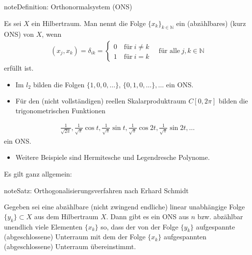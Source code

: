 \documentclass[letterpaper,10pt,english]{jupyterBook}
\begin{document}
\begin{sphinxadmonition}{note}{Definition: Orthonormalsystem (ONS)}

Es sei \(X\) ein Hilbertraum. Man nennt die Folge \(\{x_k\}_{k\in\mathbb{N}}\) ein (abzählbares)  (kurz ONS) von \(X\), wenn
\begin{equation*}
\begin{split}(x_j, x_k) = \delta_{i k} = \begin{cases}
0\quad \text{für}\ i\not= k\\
1\quad \text{für}\ i = k\end{cases}\quad \text{für alle}\ j,k\in\mathbb{N}\end{split}
\end{equation*}
erfüllt ist.
\end{sphinxadmonition}

\begin{itemize}
\item {} 
Im \(l_2\) bilden die Folgen \(\{1,0,0,\ldots\}\), \(\{0,1,0,\ldots\},\ldots \) ein ONS.

\item {} 
Für den (nicht vollständigen) reellen Skalarproduktraum \(C[0,2\pi]\) bilden die trigonometrischen Funktionen

\end{itemize}
\begin{equation*}
\begin{split}\frac{1}{\sqrt{2\pi}}, \frac{1}{\sqrt{\pi}} \cos t, \frac{1}{\sqrt{\pi}} \sin t, \frac{1}{\sqrt{\pi}} \cos 2t, \frac{1}{\sqrt{\pi}} \sin 2t, \ldots \end{split}
\end{equation*}
ein ONS.
\begin{itemize}
\item {} 
Weitere Beispiele sind Hermitesche und Legendresche Polynome.

\end{itemize}

Es gilt ganz allgemein:

\begin{sphinxadmonition}{note}{Satz: Orthogonalisierungsverfahren nach Erhard Schmidt}

Gegeben sei eine abzählbare (nicht zwingend endliche) linear unabhängige Folge \(\{y_k\} \subset X\) aus dem Hilbertraum \(X\). Dann gibt es ein ONS aus \(n\) bzw. abzählbar unendlich viele Elementen \(\{x_k\}\) so, dass der von der Folge \(\{y_k\}\) aufgespannte (abgeschlossene) Unterraum mit dem der Folge \(\{x_k\}\) aufgespannten (abgeschlossene) Unterraum übereinstimmt.
\end{sphinxadmonition}
\end{document}
